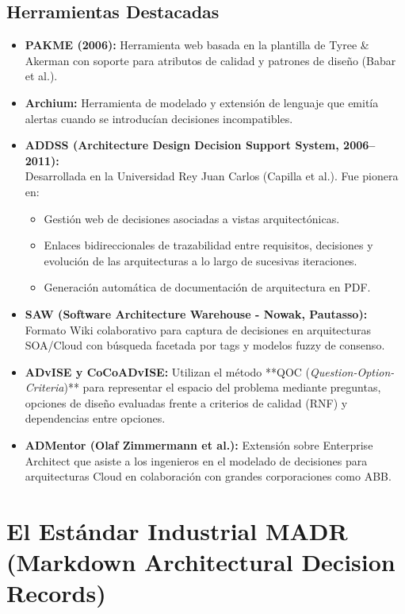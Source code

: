 \subsection{Herramientas Destacadas}

\begin{itemize}[leftmargin=1.5em]
  \item \textbf{PAKME (2006):} Herramienta web basada en la plantilla de Tyree \& Akerman con soporte para atributos de calidad y patrones de diseño (Babar et al.).
  \item \textbf{Archium:} Herramienta de modelado y extensión de lenguaje que emitía alertas cuando se introducían decisiones incompatibles.
  \item \textbf{ADDSS (Architecture Design Decision Support System, 2006--2011):}\\
  Desarrollada en la Universidad Rey Juan Carlos (Capilla et al.). Fue pionera en:
    \begin{itemize}
      \item Gestión web de decisiones asociadas a vistas arquitectónicas.
      \item Enlaces bidireccionales de trazabilidad entre requisitos, decisiones y evolución de las arquitecturas a lo largo de sucesivas iteraciones.
      \item Generación automática de documentación de arquitectura en PDF.
    \end{itemize}
  \item \textbf{SAW (Software Architecture Warehouse - Nowak, Pautasso):} Formato Wiki colaborativo para captura de decisiones en arquitecturas SOA/Cloud con búsqueda facetada por tags y modelos fuzzy de consenso.
  \item \textbf{ADvISE y CoCoADvISE:} Utilizan el método **QOC (\emph{Question-Option-Criteria})** para representar el espacio del problema mediante preguntas, opciones de diseño evaluadas frente a criterios de calidad (RNF) y dependencias entre opciones.
  \item \textbf{ADMentor (Olaf Zimmermann et al.):} Extensión sobre Enterprise Architect que asiste a los ingenieros en el modelado de decisiones para arquitecturas Cloud en colaboración con grandes corporaciones como ABB.
\end{itemize}

\section{El Estándar Industrial MADR (Markdown Architectural Decision Records)}
\label{sec:formato-madr}

